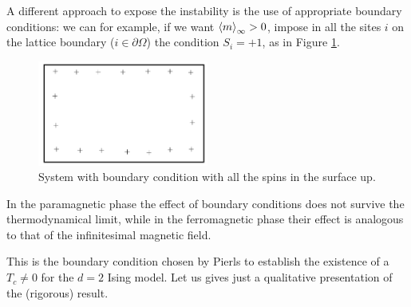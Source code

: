 \documentclass[../../Main/Main.tex]{subfiles}
\begin{document}
A different approach to expose the instability is the use of appropriate boundary conditions:
we can for example, if we want \( \expval{m}_ \infty  > 0\), impose in all the sites \(i\) on the lattice boundary (\( i \in \partial{\Omega }  \)) the condition
\( S_i = +1 \),  as in Figure \ref{fig:10_1}.

\begin{figure}[h!]
\centering
\includegraphics[width=0.5\textwidth]{./img/1.pdf}
\caption{\label{fig:10_1} System with boundary condition with all the spins in the surface up.}
\end{figure}

In the paramagnetic phase the effect of boundary conditions does not survive the thermodynamical limit, while in the ferromagnetic phase their effect is analogous to that of the infinitesimal magnetic field.

This is the boundary condition chosen by Pierls to establish the existence of a \( T_c \neq 0 \) for the \(d=2\) Ising model.
Let us gives just a qualitative presentation  of the (rigorous) result. 
\end{document}
